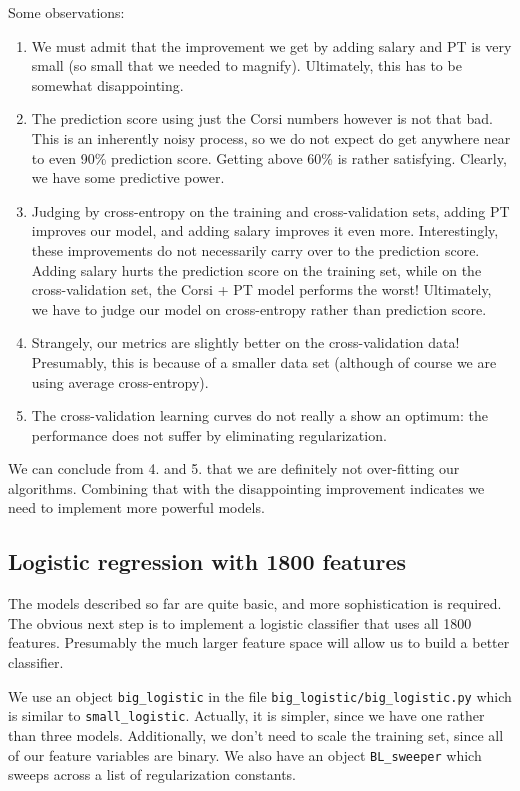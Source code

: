 \documentclass[11pt]{article}
\providecommand{\tightlist}{%
      \setlength{\itemsep}{0pt}\setlength{\parskip}{0pt}}
\begin{document}
    Some observations:

\begin{enumerate}
\def\labelenumi{\arabic{enumi}.}
\tightlist
\item
  We must admit that the improvement we get by adding salary and PT is
  very small (so small that we needed to magnify). Ultimately, this has
  to be somewhat disappointing.
\item
  The prediction score using just the Corsi numbers however is not that
  bad. This is an inherently noisy process, so we do not expect do get
  anywhere near to even 90\% prediction score. Getting above 60\% is
  rather satisfying. Clearly, we have some predictive power.
\item
  Judging by cross-entropy on the training and cross-validation sets,
  adding PT improves our model, and adding salary improves it even more.
  Interestingly, these improvements do not necessarily carry over to the
  prediction score. Adding salary hurts the prediction score on the
  training set, while on the cross-validation set, the Corsi + PT model
  performs the worst! Ultimately, we have to judge our model on
  cross-entropy rather than prediction score.
\item
  Strangely, our metrics are slightly better on the cross-validation
  data! Presumably, this is because of a smaller data set (although of
  course we are using average cross-entropy).
\item
  The cross-validation learning curves do not really a show an optimum:
  the performance does not suffer by eliminating regularization.
\end{enumerate}

We can conclude from 4. and 5. that we are definitely not over-fitting
our algorithms. Combining that with the disappointing improvement
indicates we need to implement more powerful models.

    \subsection{Logistic regression with 1800
features}\label{logistic-regression-with-1800-features}

    The models described so far are quite basic, and more sophistication is
required. The obvious next step is to implement a logistic classifier
that uses all 1800 features. Presumably the much larger feature space
will allow us to build a better classifier.

We use an object \texttt{big\_logistic} in the file
\texttt{big\_logistic/big\_logistic.py} which is similar to
\texttt{small\_logistic}. Actually, it is simpler, since we have one
rather than three models. Additionally, we don't need to scale the
training set, since all of our feature variables are binary. We also
have an object \texttt{BL\_sweeper} which sweeps across a list of
regularization constants.
\end{document}
